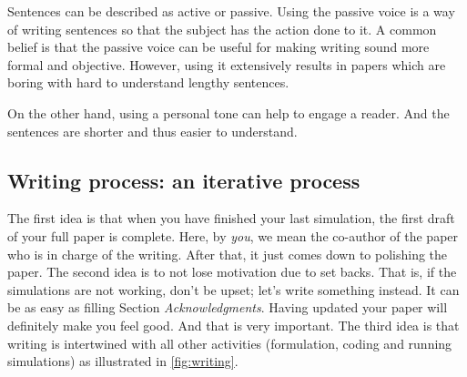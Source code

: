\documentclass[authoryear,3p,times,preprint,review,fleqn]{elsarticle}
\numberwithin{equation}{section}
\theoremstyle{remark}
\begin{document}
Sentences can be described as active or passive. Using the passive voice is a way of writing sentences so that the subject has the action done to it. A common belief is that the passive voice can be useful for making writing sound more formal and objective. However, using it extensively results in papers which are boring with hard to understand lengthy sentences.

On the other hand, using a personal tone can help to engage a reader. And the sentences are shorter and thus easier to understand. 




\subsection{Writing process: an iterative process}\label{sec:writing-process}

The first idea is that when you have finished your last simulation, the first draft of your full paper is complete. Here, by \textit{you}, we mean the co-author of the paper who is in charge of the writing. After that, it just comes down to polishing the paper. The second idea is to not lose motivation due to set backs. That is, if the simulations are not working, don't be upset; let's write something instead. It can be as easy as filling Section \textit{Acknowledgments}. Having updated your paper will definitely make you feel good. And that is very important. The third idea is that writing is intertwined with all other activities (formulation, coding and running simulations) as illustrated in \cref{fig:writing}.
\end{document}
